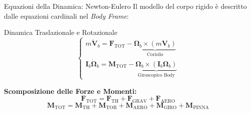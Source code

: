 \documentclass[aspectratio=169]{beamer} %
\begin{document}
\begin{frame}{Equazioni della Dinamica: Newton-Eulero}
    Il modello del corpo rigido è descritto dalle equazioni cardinali nel \textit{Body Frame}:
    
    \vspace{0.5cm}
    \begin{block}{Dinamica Traslazionale e Rotazionale}
    \begin{equation}
        \begin{cases}
            m \bm{\dot{V}}_b = \bm{F}_{\text{TOT}} - \underbrace{\bm{\Omega}_b \times (m \bm{V}_b)}_{\text{Coriolis}} \\
            \mathbf{I}_b \bm{\dot{\Omega}}_b = \bm{M}_{\text{TOT}} - \underbrace{\bm{\Omega}_b \times (\mathbf{I}_b \bm{\Omega}_b)}_{\text{Giroscopico Body}}
        \end{cases}
    \end{equation}
    \end{block}
    
    \vspace{0.5cm}
    \textbf{Scomposizione delle Forze e Momenti:}
    \begin{equation}
        \bm{F}_{\text{TOT}} = \bm{F}_{\text{TH}} + \bm{F}_{\text{GRAV}} + \bm{F}_{\text{AERO}}
    \end{equation}
    \begin{equation}
        \bm{M}_{\text{TOT}} = \bm{M}_{\text{TH}} + \bm{M}_{\text{TOR}} + \bm{M}_{\text{AERO}} + \bm{M}_{\text{GIRO}} + \bm{M}_{\text{PINNA}}
    \end{equation}
    
\end{frame}

            
        
\end{document}
